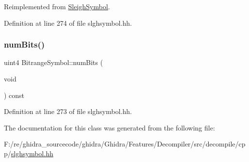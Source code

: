 Reimplemented from \mbox{\hyperlink{class_sleigh_symbol_a2f6e5903e461084c29f95ea024883950}{Sleigh\+Symbol}}.



Definition at line 274 of file slghsymbol.\+hh.

\mbox{\label{class_bitrange_symbol_a9a7b25931b2c3ad792d3af805cc72000}} 
\subsubsection{\texorpdfstring{numBits()}{numBits()}}
{\footnotesize\ttfamily uint4 Bitrange\+Symbol\+::num\+Bits (\begin{DoxyParamCaption}\item[{void}]{ }\end{DoxyParamCaption}) const\hspace{0.3cm}{\ttfamily [inline]}}



Definition at line 273 of file slghsymbol.\+hh.



The documentation for this class was generated from the following file\+:\begin{DoxyCompactItemize}
\item 
F\+:/re/ghidra\+\_\+sourcecode/ghidra/\+Ghidra/\+Features/\+Decompiler/src/decompile/cpp/\mbox{\hyperlink{slghsymbol_8hh}{slghsymbol.\+hh}}\end{DoxyCompactItemize}
